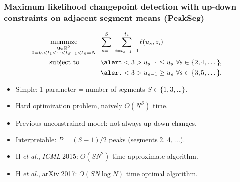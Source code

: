 \documentclass{beamer}
\DeclareMathOperator*{\minimize}{minimize}
\newcommand{\RR}{\mathbb R}
\begin{document}
\begin{frame}
  \frametitle{Maximum likelihood changepoint detection with up-down constraints on adjacent segment means (PeakSeg)}
    
\vskip -1.4cm
\begin{align*}
    \minimize_{\substack{
  \mathbf u\in\RR^{S}
\\
   0=t_0<t_1<\cdots<t_{S-1}<t_S=N
  }} &\ \ 
    \sum_{s=1}^S\  \sum_{i=t_{s-1}+1}^{t_s} \ell( u_s,  z_i) 
\\
      \text{subject to \hskip 0.75cm} &\ \ \alert<3>{u_{s-1} \leq u_s\ \forall s\in\{2,4,\dots\},}
  \nonumber\\
  &\ \ \alert<3>{u_{s-1} \geq u_s\ \forall s\in\{3,5,\dots\}.}
  \nonumber 
\end{align*}
\vskip -0.4cm
\begin{itemize}  
\item Simple: 1 parameter = number of segments $S\in\{1,3,\dots\}$.
\item Hard optimization problem, naively $O(N^S)$ time.
\item \alert<2>{Previous unconstrained model: not always up-down changes.}
\item \alert<3>{Interpretable: $P=(S-1)/2$ peaks (segments 2, 4, ...).}
\item H {\it et al.}, {\it ICML} 2015: $O(SN^2)$ time approximate
  algorithm. 
\item H {\it et al.}, arXiv 2017: $O(SN\log N)$ time optimal algorithm.
\end{itemize}
\end{frame} 
\end{document}
